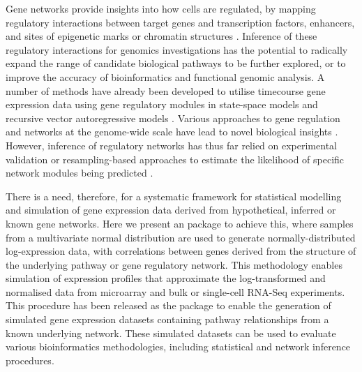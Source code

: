 \documentclass[article, shortnames]{jss}
\begin{document}
Gene networks provide insights into how cells are regulated, by mapping regulatory interactions between target genes and transcription factors, enhancers, and sites of epigenetic marks or chromatin structures \citep{Barabasi2004, Yamaguchi2007}. Inference of these regulatory interactions for genomics investigations has the potential to radically expand the range of candidate biological pathways to be further explored, or to improve the accuracy of bioinformatics and functional genomic analysis. %
A number of methods have already been developed to utilise timecourse gene expression data \citep{Arner2015, Yamaguchi2007} using gene regulatory modules in state-space models and recursive vector autoregressive models \citep{Hirose2008, Shimamura2009}. Various approaches to gene regulation and networks at the genome-wide scale have lead to novel biological insights \citep{Arner2015, Komatsu2013}. However, inference of regulatory networks has thus far relied on experimental validation or resampling-based approaches to estimate the likelihood of specific network modules being predicted \citep{Markowetz2007,Hawe2019}.

There is a need, therefore, for a systematic framework for statistical modelling and simulation of gene expression data derived from hypothetical, inferred or known gene networks. Here we present an  package to achieve this, where samples from a multivariate normal distribution are used to generate normally-distributed log-expression data, with correlations between genes derived from the structure of the underlying pathway or gene regulatory network. This methodology enables simulation of expression profiles that approximate the log-transformed and normalised data from microarray and bulk or single-cell RNA-Seq experiments. This procedure has been released as the   package to enable the generation of simulated gene expression datasets containing pathway relationships from a known underlying network. These simulated datasets can be used to evaluate various bioinformatics methodologies, including statistical and network inference procedures.

\end{document}
